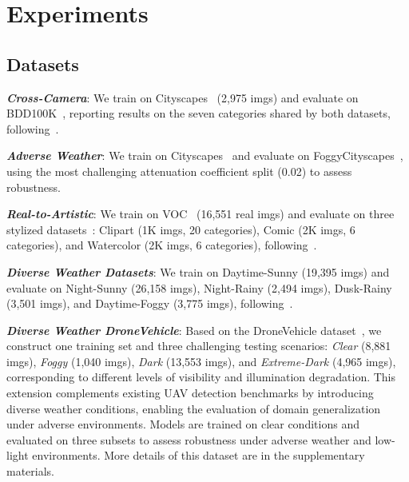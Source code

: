 \section{Experiments}
\label{sec:experiments}

\subsection{Datasets}
\noindent\textbf{\textit{Cross-Camera}}: We train on Cityscapes~\cite{cordts2016cityscapes} (2,975 imgs) and evaluate on BDD100K~\cite{yu2020bdd100k}, reporting results on the seven categories shared by both datasets, following~\cite{saito2019strong}.

\noindent\textbf{\textit{Adverse Weather}}: We train on Cityscapes~\cite{cordts2016cityscapes} and evaluate on FoggyCityscapes~\cite{sakaridis2018semantic}, using the most challenging attenuation coefficient split (0.02) to assess robustness.

\noindent\textbf{\textit{Real-to-Artistic}}: We train on VOC~\cite{everingham2010pascal} (16,551 real imgs) and evaluate on three stylized datasets~\cite{inoue2018cross}: Clipart (1K imgs, 20 categories), Comic (2K imgs, 6 categories), and Watercolor (2K imgs, 6 categories), following~\cite{li2022cross}.

\noindent\textbf{\textit{Diverse Weather Datasets}}: We train on Daytime-Sunny (19,395 imgs) and evaluate on Night-Sunny (26,158 imgs), Night-Rainy (2,494 imgs), Dusk-Rainy (3,501 imgs), and Daytime-Foggy (3,775 imgs), following~\cite{wu2022single, lee2024object}.


\noindent\textbf{\textit{Diverse Weather DroneVehicle}}:
Based on the DroneVehicle dataset~\cite{sun2022drone}, we construct one training set and three challenging testing scenarios: \textit{Clear} (8,881 imgs), \textit{Foggy} (1,040 imgs), \textit{Dark} (13,553 imgs), and \textit{Extreme-Dark} (4,965 imgs), corresponding to different levels of visibility and illumination degradation. This extension complements existing UAV detection benchmarks by introducing diverse weather conditions, 
enabling the evaluation of domain generalization under adverse environments.
Models are trained on clear conditions and evaluated on three subsets to 
assess robustness under adverse weather and low-light environments.
More details of this dataset are in the supplementary materials.


